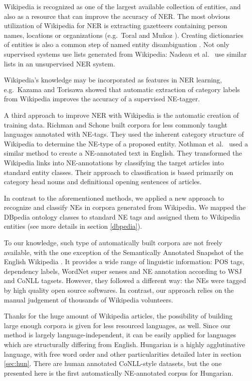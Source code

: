 \documentclass[11pt]{article}
\begin{document}
Wikipedia is recognized as one of the largest available collection of entities, and also as a resource that can improve the accuracy of NER. The most obvious utilization of Wikipedia for NER is extracting gazetteers containing person names, locations or organizations (e.g.~Toral and Mu\~noz ). Creating dictionaries of entities is also a common step of named entity disambiguation \cite{Bunescu:06,Cucerzan:07}. Not only supervised systems use lists generated from Wikipedia: Nadeau et al.~ use similar lists in an unsupervised NER system. 

Wikipedia's knowledge may be incorporated as features in NER learning, e.g.~Kazama and Torisawa  showed that automatic extraction of category labels from Wikipedia improves the accuracy of a supervised NE-tagger. 

A third approach to improve NER with Wikipedia is the automatic creation of training data. Richman and Schone  built corpora for less commonly taught languages annotated with NE-tags. They used the inherent category structure of Wikipedia to determine the NE-type of a proposed entity. Nothman et al.~ used a similar method to create a NE-annotated text in English. They transformed the Wikipedia links into NE-annotations by classifying the target articles into standard entity classes. Their approach to classification is based primarily on category head nouns and definitional opening sentences of articles. 

In contrast to the aforementioned methods, we applied a new approach to recognize and classify NEs in corpora generated from Wikipedia. We mapped the DBpedia ontology classes to standard NE tags and assigned them to Wikipedia entities (see more details in section \ref{dbpedia}).

To our knowledge, such type of automatically built corpora are not freely available, with the one exception of the Semantically Annotated Snapshot of the English Wikipedia \cite{Zaragoza:07}. It provides a wide range of linguistic information: POS tags, dependency labels, WordNet super senses and NE annotation according to WSJ and CoNLL tagsets. However, they followed a different way: the NEs were tagged by high quality open source softwares. In contrast, our approach relies on the manual judgement of thousands of Wikipedia volunteers.

Thanks for the huge amount of Wikipedia articles, the possibility of building large enough 
corpora is given for less resourced languages, as well. Since our method is largely language-independent, it can be easily applied for languages which are structurally differing from English. Hungarian is a highly agglutinative language, with free word order and other particularities detailed later in section \ref{sec:hun}. There are human annotated CoNLL-style datasets, but the one presented here is the first automatically NE-annotated corpus for Hungarian.
\end{document}
